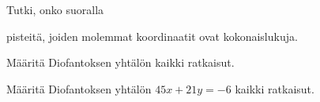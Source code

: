 \begin{tehtavasivu}
\begin{tehtava}
    \begin{alakohdat}
    \end{alakohdat}

    \begin{vastaus}
        \begin{alakohdat}
        \end{alakohdat}
    \end{vastaus}
    
\end{tehtava}

\begin{tehtava}
    Tutki, onko suoralla
    \begin{alakohdat}
    \end{alakohdat}
    pisteitä, joiden molemmat koordinaatit ovat kokonaislukuja.

    \begin{vastaus}
        \begin{alakohdat}
        \end{alakohdat}
    \end{vastaus}
    
\end{tehtava}

\begin{tehtava}
    Määritä Diofantoksen yhtälön kaikki ratkaisut.
    
    \begin{alakohdat}
    \end{alakohdat}

    \begin{vastaus}
        \begin{alakohdat}
        \end{alakohdat}
    \end{vastaus}
    
\end{tehtava}

\begin{tehtava}
    Määritä Diofantoksen yhtälön $45x + 21y = -6$ kaikki ratkaisut.


\end{tehtava}
\end{tehtavasivu}
